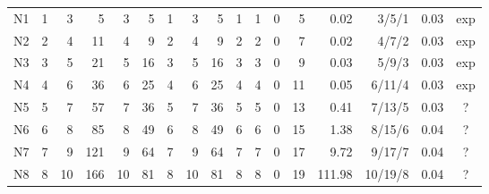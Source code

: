 \begin{table}[t]
\begin{tabular}{@{}lrrrrrrrrrrrrrrrc@{}}
N1 & 1 & 3 & 5 & 3 & 5 & 1 & 3 & 5 & 1 & 1 & 0 & 5 & 0.02 & 3/5/1 & 0.03 & exp\\
N2 & 2 & 4 & 11 & 4 & 9 & 2 & 4 & 9 & 2 & 2 & 0 & 7 & 0.02 & 4/7/2 & 0.03 & exp\\
N3 & 3 & 5 & 21 & 5 & 16 & 3 & 5 & 16 & 3 & 3 & 0 & 9 & 0.03 & 5/9/3 & 0.03 & exp\\
N4 & 4 & 6 & 36 & 6 & 25 & 4 & 6 & 25 & 4 & 4 & 0 & 11 & 0.05 & 6/11/4 & 0.03 & exp\\
N5 & 5 & 7 & 57 & 7 & 36 & 5 & 7 & 36 & 5 & 5 & 0 & 13 & 0.41 & 7/13/5 & 0.03 & ?\\
N6 & 6 & 8 & 85 & 8 & 49 & 6 & 8 & 49 & 6 & 6 & 0 & 15 & 1.38 & 8/15/6 & 0.04 & ?\\
N7 & 7 & 9 & 121 & 9 & 64 & 7 & 9 & 64 & 7 & 7 & 0 & 17 & 9.72 & 9/17/7 & 0.04 & ?\\
N8 & 8 & 10 & 166 & 10 & 81 & 8 & 10 & 81 & 8 & 8 & 0 & 19 & 111.98 & 10/19/8 & 0.04 & ?\\
\bottomrule
\end{tabular}
\end{table}
